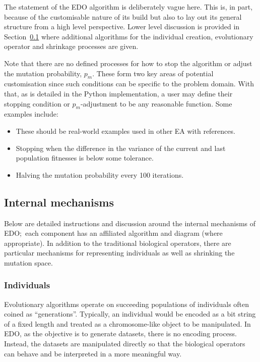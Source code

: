 The statement of the EDO algorithm is deliberately vague here. This is, in part,
because of the customisable nature of its build but also to lay out its general
structure from a high level perspective. Lower level discussion is provided in
Section~\ref{subsection:mechanisms} where additional algorithms for the
individual creation, evolutionary operator and shrinkage processes are given.

Note that there are no defined processes for how to stop the algorithm or adjust
the mutation probability, \(p_m\). These form two key areas of potential
customisation since such conditions can be specific to the problem domain. With
that, as is detailed in the Python implementation, a user may define their
stopping condition or \(p_m\)-adjustment to be any reasonable function. Some
examples include:

\begin{itemize}
    \item These should be real-world examples used in other EA with references.
    \item Stopping when the difference in the variance of the current and last
        population fitnesses is below some tolerance.
    \item Halving the mutation probability every 100 iterations.
\end{itemize}

\subsection{Internal mechanisms}\label{subsection:mechanisms}

Below are detailed instructions and discussion around the internal mechanisms of
EDO;\ each component has an affiliated algorithm and diagram (where
appropriate). In addition to the traditional biological operators, there are
particular mechanisms for representing individuals as well as shrinking the
mutation space.

\subsubsection{Individuals}

Evolutionary algorithms operate on succeeding populations of individuals often
coined as ``generations''. Typically, an individual would be encoded as a bit
string of a fixed length and treated as a chromosome-like object to be
manipulated. In EDO, as the objective is to generate datasets, there is no
encoding process. Instead, the datasets are manipulated directly so that the
biological operators can behave and be interpreted in a more meaningful way.

